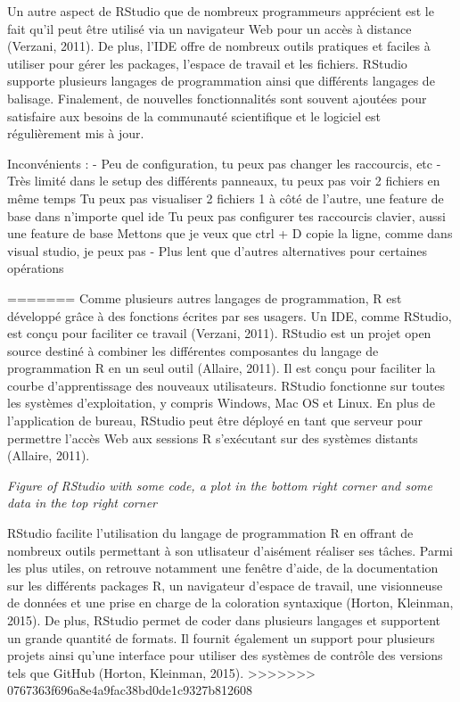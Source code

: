 \documentclass[
  letterpaper,
  DIV=11,
  numbers=noendperiod]{scrreprt}
\begin{document}
Un autre aspect de RStudio que de nombreux programmeurs apprécient est
le fait qu'il peut être utilisé via un navigateur Web pour un accès à
distance (Verzani, 2011). De plus, l'IDE offre de nombreux outils
pratiques et faciles à utiliser pour gérer les packages, l'espace de
travail et les fichiers. RStudio supporte plusieurs langages de
programmation ainsi que différents langages de balisage. Finalement, de
nouvelles fonctionnalités sont souvent ajoutées pour satisfaire aux
besoins de la communauté scientifique et le logiciel est régulièrement
mis à jour.

Inconvénients : - Peu de configuration, tu peux pas changer les
raccourcis, etc - Très limité dans le setup des différents panneaux, tu
peux pas voir 2 fichiers en même temps Tu peux pas visualiser 2 fichiers
1 à côté de l'autre, une feature de base dans n'importe quel ide Tu peux
pas configurer tes raccourcis clavier, aussi une feature de base Mettons
que je veux que ctrl + D copie la ligne, comme dans visual studio, je
peux pas - Plus lent que d'autres alternatives pour certaines opérations

======= Comme plusieurs autres langages de programmation, R est
développé grâce à des fonctions écrites par ses usagers. Un IDE, comme
RStudio, est conçu pour faciliter ce travail (Verzani, 2011). RStudio
est un projet open source destiné à combiner les différentes composantes
du langage de programmation R en un seul outil (Allaire, 2011). Il est
conçu pour faciliter la courbe d'apprentissage des nouveaux
utilisateurs. RStudio fonctionne sur toutes les systèmes d'exploitation,
y compris Windows, Mac OS et Linux. En plus de l'application de bureau,
RStudio peut être déployé en tant que serveur pour permettre l'accès Web
aux sessions R s'exécutant sur des systèmes distants (Allaire, 2011).

\emph{Figure of RStudio with some code, a plot in the bottom right
corner and some data in the top right corner}

RStudio facilite l'utilisation du langage de programmation R en offrant
de nombreux outils permettant à son utlisateur d'aisément réaliser ses
tâches. Parmi les plus utiles, on retrouve notamment une fenêtre d'aide,
de la documentation sur les différents packages R, un navigateur
d'espace de travail, une visionneuse de données et une prise en charge
de la coloration syntaxique (Horton, Kleinman, 2015). De plus, RStudio
permet de coder dans plusieurs langages et supportent un grande quantité
de formats. Il fournit également un support pour plusieurs projets ainsi
qu'une interface pour utiliser des systèmes de contrôle des versions
tels que GitHub (Horton, Kleinman, 2015).
\textgreater\textgreater\textgreater\textgreater\textgreater\textgreater\textgreater{}
0767363f696a8e4a9fac38bd0de1c9327b812608
\end{document}
